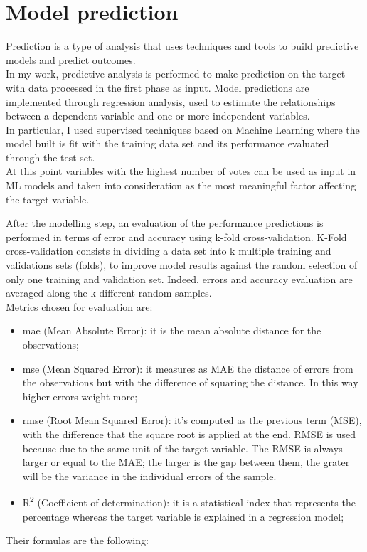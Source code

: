 \section{Model prediction}
Prediction is a type of analysis that uses techniques and tools to build predictive models and predict outcomes. \\
In my work, predictive analysis is performed to make prediction on the target with data processed in the first phase as input.\newline
Model predictions are implemented through regression analysis, used to estimate the relationships between a dependent variable and one or more independent variables.\\
In particular, I used supervised techniques based on Machine Learning where the model built is fit with the training data set and its performance evaluated through the test set. 
\\
At this point variables with the highest number of votes can be used as input in ML models and taken into consideration as the most meaningful factor affecting the target variable.
\par
After the modelling step, an evaluation of the performance predictions is performed in terms of error and accuracy using k-fold cross-validation.\newline
K-Fold cross-validation consists in dividing a data set into k multiple training and validations sets (folds), to improve model results against the random selection of only one training and validation set. Indeed, errors and accuracy evaluation are averaged along the k different random samples.\\
Metrics chosen for evaluation are:
\begin{itemize}
    \item \acrshort{mae} (Mean Absolute Error): it is the mean absolute distance for the observations;
    \item \acrshort{mse} (Mean Squared Error): it measures as MAE the distance of errors from the observations but with the difference of squaring the distance. In this way higher errors weight more;
    \item \acrshort{rmse} (Root Mean Squared Error): it's computed as the previous term (MSE), with the difference that the square root is applied at the end. RMSE is used because due to the same unit of the target variable.
    The RMSE is always larger or equal to the MAE; the larger is the gap between them, the grater will be the variance in the individual errors of the sample.
    \item R\textsuperscript{2} (Coefficient of determination): it is a statistical index that represents the percentage whereas the target variable is explained in a regression model;
\end{itemize} 
Their formulas are the following:
